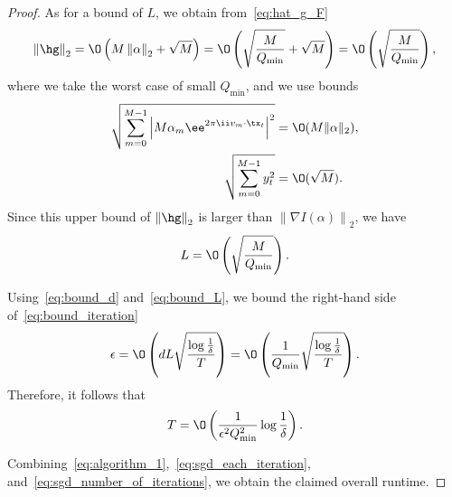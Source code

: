 \begin{proof}
As for a bound of $L$, we obtain from~\cref{eq:hat_g_F}
\begin{equation}
  \left\|\hg\right\|_2=\O\left(M\left\|\alpha\right\|_2+\sqrt{M}\right)=\O\left(\sqrt{\frac{M}{Q_{\min}}}+\sqrt{M}\right)=\O\left(\sqrt{\frac{M}{Q_{\min}}}\right),
\end{equation}
where we take the worst case of small $Q_{\min}$, and we use bounds
\begin{align}
  \sqrt{\sum_{m=0}^{M-1} {\left|M\alpha_m \ee^{2\pi\ii v_m\cdot \tx_t}\right|}^2}&=\O(M\|\alpha\|_2),\\
  \sqrt{\sum_{m=0}^{M-1} y_t^2}&=\O(\sqrt{M}).
\end{align}
Since this upper bound of $\left\|\hg\right\|_2$ is larger than $\left\|\nabla I(\alpha)\right\|_2$,
we have
\begin{equation}
  \label{eq:bound_L}
  L=\O\left(\sqrt{\frac{M}{Q_{\min}}}\right).
\end{equation}

Using~\cref{eq:bound_d} and~\cref{eq:bound_L}, we bound the right-hand side of~\cref{eq:bound_iteration}
\begin{equation}
  \epsilon=\O\left(dL\sqrt{\frac{\log\frac{1}{\delta}}{T}}\right)=\O\left(\frac{1}{Q_{\min}}\sqrt{\frac{\log\frac{1}{\delta}}{T}}\right).
\end{equation}
Therefore, it follows that
\begin{equation}
  \label{eq:sgd_number_of_iterations}
  T=\O\left(\frac{1}{\epsilon^2 Q_{\min}^2}\log\frac{1}{\delta}\right).
\end{equation}

Combining~\cref{eq:algorithm_1},~\cref{eq:sgd_each_iteration}, and~\cref{eq:sgd_number_of_iterations}, we obtain the claimed overall runtime.
\end{proof}
